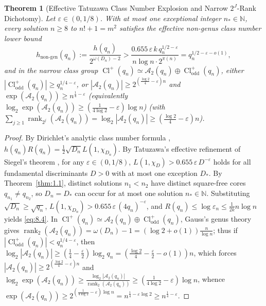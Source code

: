 \documentclass[11pt,reqno]{amsart}
\newtheorem{theorem}{Theorem}[section]
\theoremstyle{remark}
\numberwithin{equation}{section}
\newcommand{\N}{\mathbb{N}}
\DeclareMathOperator{\Cl}{Cl}
\DeclareMathOperator{\rank}{rank}
\begin{document}
\begin{theorem}[{Effective Tatuzawa Class Number Explosion and Narrow $2^J$-Rank Dichotomy}]\label{thm:8.2}
Let $\varepsilon \in (0, 1/8)$. With at most one exceptional integer $n_* \in \N$, every solution $n \ge 8$ to $n! + 1 = m^2$ satisfies the effective non-genus class number lower bound
\begin{equation}\label{eq:8.4}
h_{\mathrm{non\text{-}gen}}(q_n) := \frac{h(q_n)}{2^{\omega(D_n)-2}} > \frac{0.655\,\varepsilon\,k\,q_n^{1/2-\varepsilon}}{n\log n \cdot 2^{\pi(n)}} = q_n^{1/2-\varepsilon-o(1)},
\end{equation}
and in the narrow class group $\Cl^+(q_n) \simeq \mathcal{A}_2(q_n) \oplus \Cl_{\mathrm{odd}}^+(q_n)$, either $|\Cl_{\mathrm{odd}}^+(q_n)| \ge q_n^{1/4-\varepsilon}$, or $|\mathcal{A}_2(q_n)| \ge 2^{(\frac{\log 2}{4} - \varepsilon)n}$ and $\exp(\mathcal{A}_2(q_n)) \ge n^{\frac{1}{4}-\varepsilon}$ (equivalently $\log_2 \exp(\mathcal{A}_2(q_n)) \ge (\frac{1}{4\log 2} - \varepsilon)\log n$) (with $\sum_{j \ge 1} \rank_{2^j}(\mathcal{A}_2(q_n)) = \log_2|\mathcal{A}_2(q_n)| \ge (\frac{\log 2}{4} - \varepsilon)n$).
\end{theorem}

\begin{proof}
By Dirichlet's analytic class number formula \cite[Chapter~6]{Davenport2000}, $h(q_n)R(q_n) = \frac{1}{2}\sqrt{D_n} L(1, \chi_{D_n})$. By Tatuzawa's effective refinement of Siegel's theorem \cite{Siegel1935,Tatuzawa1951}, for any $\varepsilon \in (0, 1/8)$, $L(1, \chi_D) > 0.655\,\varepsilon\,D^{-\varepsilon}$ holds for all fundamental discriminants $D > 0$ with at most one exception $D_*$. By Theorem~\ref{thm:1.1}, distinct solutions $n_1 < n_2$ have distinct square-free cores $q_{n_1} \ne q_{n_2}$, so $D_n = D_*$ can occur for at most one solution $n_* \in \N$. Substituting $\sqrt{D_n} \ge \sqrt{q_n}$, $L(1, \chi_{D_n}) > 0.655\,\varepsilon\,(4q_n)^{-\varepsilon}$, and $R(q_n) \le \log \varepsilon_n \le \frac{1}{2k}n\log n$ yields \eqref{eq:8.4}. In $\Cl^+(q_n) \simeq \mathcal{A}_2(q_n) \oplus \Cl_{\mathrm{odd}}^+(q_n)$, Gauss's genus theory gives $\rank_2(\mathcal{A}_2(q_n)) = \omega(D_n) - 1 = (\log 2 + o(1))\frac{n}{\log n}$; thus if $|\Cl_{\mathrm{odd}}^+(q_n)| < q_n^{1/4-\varepsilon}$, then $\log_2|\mathcal{A}_2(q_n)| \ge (\frac{1}{4} - \frac{\varepsilon}{2})\log_2 q_n = (\frac{\log 2}{4} - \frac{\varepsilon}{2} - o(1))n$, which forces $|\mathcal{A}_2(q_n)| \ge 2^{(\frac{\log 2}{4} - \varepsilon)n}$ and $\log_2\exp(\mathcal{A}_2(q_n)) \ge \frac{\log_2|\mathcal{A}_2(q_n)|}{\rank_2(\mathcal{A}_2(q_n))} \ge (\frac{1}{4\log 2} - \varepsilon)\log n$, whence $\exp(\mathcal{A}_2(q_n)) \ge 2^{(\frac{1}{4\log 2} - \varepsilon)\log n} = n^{\frac{1}{4} - \varepsilon\log 2} \ge n^{\frac{1}{4} - \varepsilon}$.
\end{proof}
\end{document}
